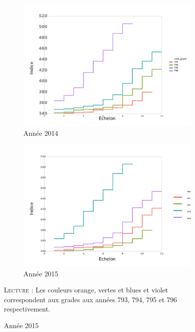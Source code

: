 \documentclass[11pt,a4paper]{article}
\begin{document}
\begin{figure}[ht]
  \begin{subfigure}[b]{0.55\linewidth}
      \caption{Année 2014} 
    \label{echelon_by_neg_2} 
    \centering
    \includegraphics[width=1\linewidth]{2_grille_by_date.pdf} 
  \end{subfigure}%
  \begin{subfigure}[b]{0.55\linewidth}
      \caption{Année 2015} 
    \label{echelon_by_neg_3} 
    \centering
    \includegraphics[width=1\linewidth]{3_grille_by_date.pdf} 
  \end{subfigure} 
   \begin{minipage}{15cm}
 \footnotesize
 \textsc{Lecture : }Les couleurs orange, vertes et blues et violet correspondent aux grades aux années 793, 794, 795 et 796 respectivement. 
 
 \end{minipage}
\end{figure}
\end{document}
